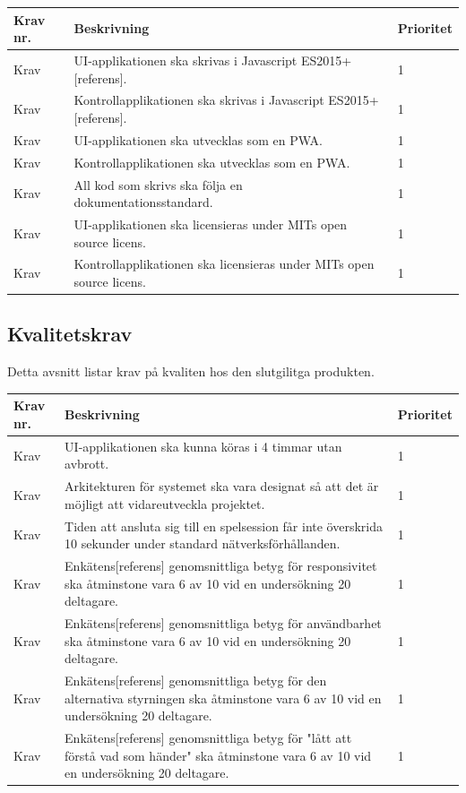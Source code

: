 \documentclass[10pt]{article}
\newcounter{indexcounter}
\newcommand{\Krav}[2]{
	\stepcounter{indexcounter}
	Krav \arabic{indexcounter} & #1 & #2 \\ \hline
}
\begin{document}
	\begin{tabular}{| p{2cm} | p{8cm} | p{2cm}|}
		\hline
		\textbf{Krav nr.} & \textbf{Beskrivning} & \textbf{Prioritet} \\ \hline
		
		\Krav{UI-applikationen ska skrivas i Javascript ES2015+[referens].}{1}
		\Krav{Kontrollapplikationen ska skrivas i Javascript ES2015+[referens].}{1}
		\Krav{UI-applikationen ska utvecklas som en PWA.}{1}
		\Krav{Kontrollapplikationen ska utvecklas som en PWA.}{1}
		\Krav{All kod som skrivs ska följa en dokumentationsstandard.}{1}
		\Krav{UI-applikationen ska licensieras under MITs open source licens.}{1}
		\Krav{Kontrollapplikationen ska licensieras under MITs open source licens.}{1}
		
	\end{tabular}

	\subsection{Kvalitetskrav}
	Detta avsnitt listar krav på kvaliten hos den slutgilitga produkten.
	
		\begin{tabular}{|p{2cm}|p{8cm}|p{2cm}|}
		\hline
		\textbf{Krav nr.} & \textbf{Beskrivning} & \textbf{Prioritet} \\ \hline
		
		\Krav{UI-applikationen ska kunna köras i 4 timmar utan avbrott.}{1}
		\Krav{Arkitekturen för systemet ska vara designat så att det är möjligt att vidareutveckla projektet.}{1}
		\Krav{Tiden att ansluta sig till en spelsession får inte överskrida 10 sekunder under standard nätverksförhållanden.}{1}
		\Krav{Enkätens[referens] genomsnittliga betyg för responsivitet ska åtminstone vara 6 av 10 vid en undersökning 20 deltagare.}{1}
		\Krav{Enkätens[referens] genomsnittliga betyg för användbarhet ska åtminstone vara 6 av 10 vid en undersökning 20 deltagare.}{1}
		\Krav{Enkätens[referens] genomsnittliga betyg för den alternativa styrningen ska åtminstone vara 6 av 10 vid en undersökning 20 deltagare.}{1}
		\Krav{Enkätens[referens] genomsnittliga betyg för "lått att förstå vad som händer" ska åtminstone vara 6 av 10 vid en undersökning 20 deltagare.}{1}
				
	\end{tabular}
	
\pagebreak

\printbibliography
{}
\end{document}
